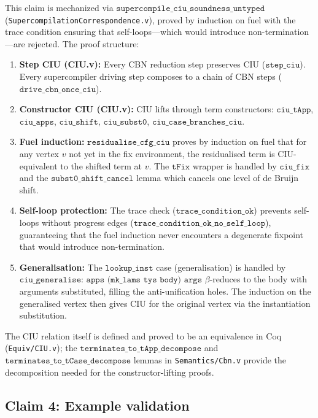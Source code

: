 This claim is mechanized via $\texttt{supercompile\_ciu\_soundness\_untyped}$ (\texttt{SupercompilationCorrespondence.v}), proved by induction on fuel with the trace condition ensuring that self-loops---which would introduce non-termination---are rejected. The proof structure:

\begin{enumerate}
\item \textbf{Step CIU (CIU.v):} Every CBN reduction step preserves CIU ($\texttt{step\_ciu}$). Every supercompiler driving step composes to a chain of CBN steps ($\texttt{drive\_cbn\_once\_ciu}$).
\item \textbf{Constructor CIU (CIU.v):} CIU lifts through term constructors: $\texttt{ciu\_tApp}$, $\texttt{ciu\_apps}$, $\texttt{ciu\_shift}$, $\texttt{ciu\_subst0}$, $\texttt{ciu\_case\_branches\_ciu}$.
\item \textbf{Fuel induction:} $\texttt{residualise\_cfg\_ciu}$ proves by induction on fuel that for any vertex $v$ not yet in the fix environment, the residualised term is CIU-equivalent to the shifted term at $v$. The $\texttt{tFix}$ wrapper is handled by $\texttt{ciu\_fix}$ and the $\texttt{subst0\_shift\_cancel}$ lemma which cancels one level of de Bruijn shift.
\item \textbf{Self-loop protection:} The trace check ($\texttt{trace\_condition\_ok}$) prevents self-loops without progress edges ($\texttt{trace\_condition\_ok\_no\_self\_loop}$), guaranteeing that the fuel induction never encounters a degenerate fixpoint that would introduce non-termination.
\item \textbf{Generalisation:} The $\texttt{lookup\_inst}$ case (generalisation) is handled by $\texttt{ciu\_generalise}$: $\texttt{apps (mk\_lams tys body) args}$ $\beta$-reduces to the body with arguments substituted, filling the anti-unification holes. The induction on the generalised vertex then gives CIU for the original vertex via the instantiation substitution.
\end{enumerate}

The CIU relation itself is defined and proved to be an equivalence in Coq (\texttt{Equiv/CIU.v}); the $\texttt{terminates\_to\_tApp\_decompose}$ and $\texttt{terminates\_to\_tCase\_decompose}$ lemmas in \texttt{Semantics/Cbn.v} provide the decomposition needed for the constructor-lifting proofs.

\subsection{Claim 4: Example validation}

